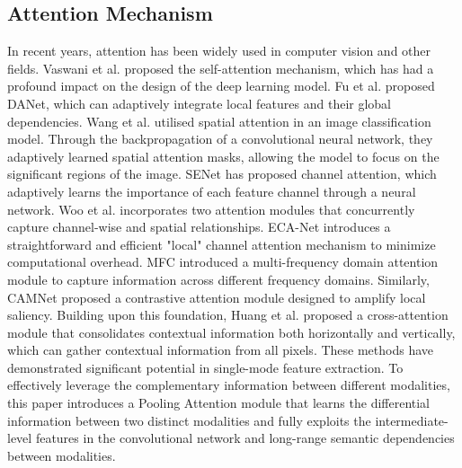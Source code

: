 \documentclass{aims}
\numberwithin{equation}{section}
\begin{document}
\subsection{Attention Mechanism}
In recent years, attention \cite{vaswani2017attention, shen2022hsgnet, fu2019dual, shen2021efficient, shen2022hsgm, woo2018cbam} has been widely used in computer vision and other fields. Vaswani et al. \cite{vaswani2017attention} proposed the self-attention mechanism, which has had a profound impact on the design of the deep learning model. Fu et al. \cite{fu2019dual} proposed DANet, which can adaptively integrate local features and their global dependencies. Wang et al. \cite{wang2017residual} utilised spatial attention in an image classification model. Through the backpropagation of a convolutional neural network, they adaptively learned spatial attention masks, allowing the model to focus on the significant regions of the image. SENet \cite{hu2018squeeze} has proposed channel attention, which adaptively learns the importance of each feature channel through a neural network. Woo et al. \cite{woo2018cbam} incorporates two attention modules that concurrently capture channel-wise and spatial relationships. ECA-Net \cite{wang2020eca} introduces a straightforward and efficient "local" channel attention mechanism to minimize computational overhead. MFC \cite{qiao2022novel}introduced a multi-frequency domain attention module to capture information across different frequency domains. Similarly, CAMNet \cite{li2022enhancing} proposed a contrastive attention module designed to amplify local saliency. Building upon this foundation, Huang et al. \cite{huang2019ccnet} proposed a cross-attention module that consolidates contextual information both horizontally and vertically, which can gather contextual information from all pixels. These methods have demonstrated significant potential in single-mode feature extraction. To effectively leverage the complementary information between different modalities, this paper introduces a Pooling Attention module that learns the differential information between two distinct modalities and fully exploits the intermediate-level features in the convolutional network and long-range semantic dependencies between modalities.
\end{document}
